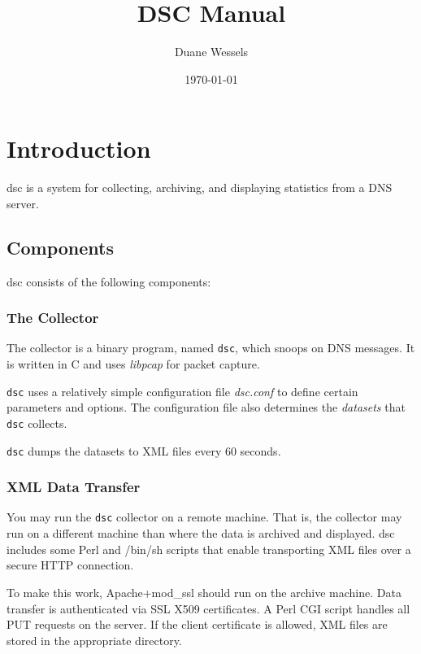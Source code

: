 \documentclass{report}
\def\dsc{{\sc dsc}}
\begin{document}
\begin{titlepage}
\title{DSC Manual}
\author{Duane Wessels}
\date{\today}
\end{titlepage}

\maketitle

\chapter{Introduction}

{\dsc} is a system for collecting, archiving, and displaying statistics from
a DNS server.  

\section{Components}

{\dsc} consists of the following components:

\subsection{The Collector}

The collector is a binary program, named {\tt dsc\/}, which snoops on 
DNS messages.  It is written in C and uses {\em libpcap\/} for packet capture.

{\tt dsc\/} uses a relatively simple configuration file {\em dsc.conf\/} to define certain
parameters and options.  The configuration file also determines the {\em datasets\/}
that {\tt dsc\/} collects.

{\tt dsc\/} dumps the datasets to XML files every 60 seconds.

\subsection{XML Data Transfer}

You may run the {\tt dsc\/} collector on a remote machine.  That
is, the collector may run on a different machine than where the
data is archived and displayed.  {\dsc} includes some Perl and /bin/sh
scripts that enable transporting XML files over a secure HTTP
connection.

To make this work, Apache+mod\_ssl should run on the archive machine.
Data transfer is authenticated via SSL X509 certificates.  A Perl
CGI script handles all PUT requests on the server.  If the client
certificate is allowed, XML files are stored in the appropriate
directory.
\end{document}

